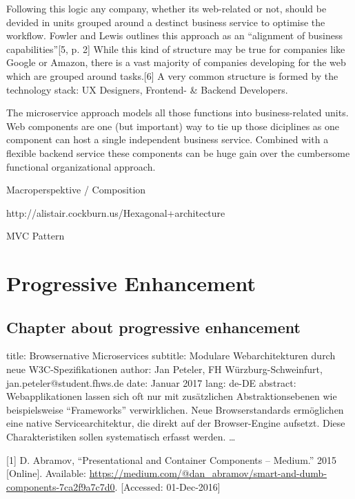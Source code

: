 \documentclass[]{assets/latex/ieee}
\begin{document}
Following this logic any company, whether its web-related or not, should
be devided in units grouped around a destinct business service to
optimise the workflow. Fowler and Lewis outlines this approach as an
``alignment of business capabilities''{[}5, p. 2{]} While this kind of
structure may be true for companies like Google or Amazon, there is a
vast majority of companies developing for the web which are grouped
around tasks.{[}6{]} A very common structure is formed by the technology
stack: UX Designers, Frontend- \& Backend Developers.

The microservice approach models all those functions into
business-related units. Web components are one (but important) way to
tie up those diciplines as one component can host a single independent
business service. Combined with a flexible backend service these
components can be huge gain over the cumbersome functional
organizational approach.

Macroperspektive / Composition

http://alistair.cockburn.us/Hexagonal+architecture

MVC Pattern

\section{Progressive Enhancement}\label{progressive-enhancement}

\subsection{Chapter about progressive
enhancement}\label{chapter-about-progressive-enhancement}

title: Browsernative Microservices subtitle: Modulare Webarchitekturen
durch neue W3C-Spezifikationen author: Jan Peteler, FH
Würzburg-Schweinfurt, jan.peteler@student.fhws.de date: Januar 2017
lang: de-DE abstract: Webapplikationen lassen sich oft nur mit
zusätzlichen Abstraktionsebenen wie beispielsweise ``Frameworks''
verwirklichen. Neue Browserstandards ermöglichen eine native
Servicearchitektur, die direkt auf der Browser-Engine aufsetzt. Diese
Charakteristiken sollen systematisch erfasst werden. \ldots{}

\hypertarget{refs}{}
\hypertarget{ref-Abramov2015}{}
{[}1{]} D. Abramov, ``Presentational and Container Components --
Medium.'' 2015 {[}Online{]}. Available:
\url{https://medium.com/@dan_abramov/smart-and-dumb-components-7ca2f9a7c7d0}.
{[}Accessed: 01-Dec-2016{]}
\end{document}
